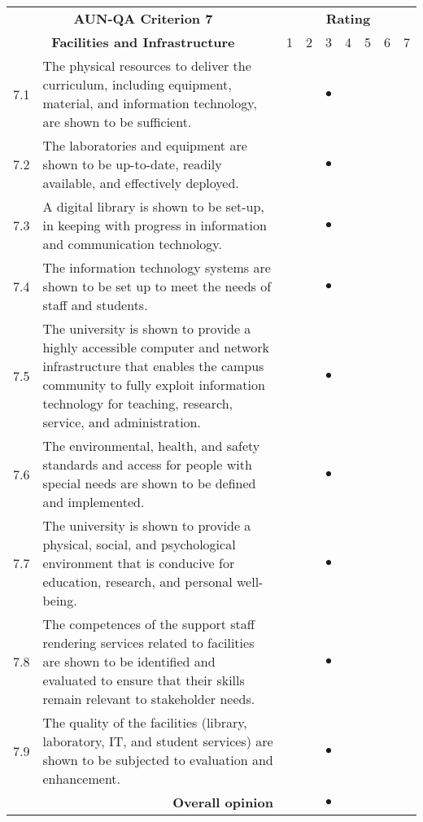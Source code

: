 \begin{longtable}{|c| p{}|p{0.3cm}|p{0.3cm}|c|p{0.3cm}|p{0.3cm}|p{0.3cm}|p{0.3cm}|}
	\hline
	\multicolumn{2}{|c|}{\bf AUN-QA Criterion 7}&\multicolumn{7}{c|}{\bf Rating}\\\cline{3-9}
	\multicolumn{2}{|c|}{\bf Facilities and Infrastructure}&1&2&3&4&5&6&7\\\hline
	\endhead

7.1&The physical resources to deliver the curriculum, including equipment, material, and information technology, are shown to be sufficient.&&& {\huge{$\bullet$}}&&&&\\\hline

7.2& The laboratories and equipment are shown to be up-to-date, readily available, and effectively deployed.&&& {\huge{$\bullet$}}&&&&\\\hline

7.3&A digital library is shown to be set-up, in keeping with progress in information and communication technology.&&& {\huge{$\bullet$}}&&&&\\\hline

7.4&The information technology systems are shown to be set up to meet the needs of staff and students.&&& {\huge{$\bullet$}}&&&&\\\hline

7.5&The university is shown to provide a highly accessible computer and network infrastructure that enables the campus community to fully exploit information technology for teaching, research, service, and administration.&&& {\huge{$\bullet$}}&&&&\\\hline

7.6&The environmental, health, and safety standards and access for people with special needs are shown to be defined and implemented.&&& {\huge{$\bullet$}}&&&&\\\hline

7.7&The university is shown to provide a physical, social, and psychological environment that is conducive for education, research, and personal well-being.&&& {\huge{$\bullet$}}&&&&\\\hline

7.8&The competences of the support staff rendering services related to facilities are shown to be identified and evaluated to ensure that their skills remain relevant to stakeholder needs.&&& {\huge{$\bullet$}}&&&&\\\hline

7.9&The quality of the facilities (library, laboratory, IT, and student services) are shown to be subjected to evaluation and enhancement.&&& {\huge{$\bullet$}}&&&&\\\hline

\multicolumn{2}{|r|}{\bf Overall opinion}&&& {\huge{$\bullet$}}&&&&\\\hline
\end{longtable}

